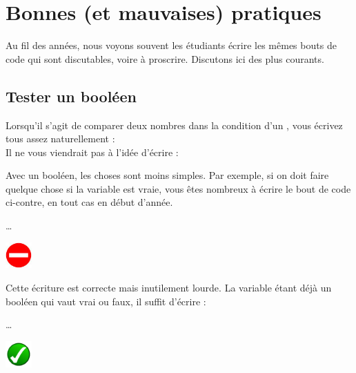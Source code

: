 \chapter{Bonnes (et mauvaises) pratiques}

	Au fil des années,
	nous voyons souvent les étudiants écrire
	les mêmes bouts de code qui sont discutables,
	voire à proscrire.
	Discutons ici des plus courants.
	
\section{Tester un booléen}

	Lorsqu'il s'agit de comparer deux nombres dans la condition
	d'un , vous écrivez tous assez naturellement :
	\\Il ne vous viendrait pas à l'idée d'écrire :
	
	\bigskip
	\begin{minipage}{9cm}
		Avec un booléen, les choses sont moins simples.
		Par exemple, si on doit faire quelque chose
		si la variable  est vraie,
		vous êtes nombreux à écrire
		le bout de code ci-contre,
		en tout cas en début d'année.
	\end{minipage}
	\quad
	\begin{minipage}{4cm}
		\begin{LDA}
			\Stmt \dots
		\EndIf
		\end{LDA}
	\end{minipage}
	\hskip-5mm
	\includegraphics[width=1cm]{icon/dont}
	
	\bigskip
	\begin{minipage}{9cm}
		Cette écriture est correcte mais inutilement lourde.
		La variable étant déjà un booléen qui vaut vrai ou faux,
		il suffit d'écrire :
	\end{minipage}
	\quad
	\begin{minipage}{4cm}
		\begin{LDA}
		\If{adulte}
			\Stmt \dots
		\EndIf
		\end{LDA}
	\end{minipage}
	\hskip-5mm
	\includegraphics[width=1cm]{icon/do}
	
